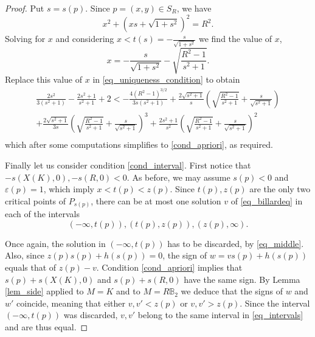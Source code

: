 \documentclass{amsart}
\def \B{\mathbb B}
\def \e{\varepsilon}
\begin{document}
\begin{proof}
	Put $s = s(p)$. Since $p = (x,y) \in S_R$, we have
	\[
		x^2 + (x s + \sqrt{1+s^2})^2 = R^2.
	\]
	Solving for $x$ and considering $x < t(s) = - \frac s {\sqrt{1+s^2}}$ we find the value of $x$,
	\[
		x = - \frac s {\sqrt{1+s^2}} - \sqrt{\frac{R^2-1}{s^2+1}}.
	\]
	Replace this value of $x$ in \eqref{eq_uniqueness_condition} to obtain
	\begin{align}
		\frac{2 s^2}{3 (s^2+1)}-\frac{2 s^2+1}{s^2+1}+2 <
		-\frac{4 (R^2-1)^{3/2}}{3 s (s^2+1)}
		+\frac{2 \sqrt{s^2+1} }{s} \left(\sqrt{\frac{R^2-1}{s^2+1}} +\frac{s}{\sqrt{s^2+1}}\right) \\
		+\frac{2 \sqrt{s^2+1}}{3 s} \left(\sqrt{\frac{R^2-1}{s^2+1}}+\frac{s}{\sqrt{s^2+1}}\right)^3
		+\frac{2 s^2+1}{s^2} \left(\sqrt{\frac{R^2-1}{s^2+1}}+\frac{s}{\sqrt{s^2+1}}\right)^2 \\
	\end{align}
	which after some computations simplifies to \eqref{cond_apriori}, as required.
	
	Finally let us consider condition \eqref{cond_interval}.
	First notice that $-s(X(K),0), -s(R,0) < 0$.
	As before, we may assume $s(p) < 0$ and $\e(p) = 1$, which imply $x < t(p) < z(p)$.
	Since $t(p), z(p)$ are the only two critical points of $P_{s(p)} $, there can be at most one solution $v$ of \eqref{eq_billardeq} in each of the intervals
	\begin{equation}
		\label{eq_intervals}
		(-\infty, t(p)), (t(p), z(p)), (z(p), \infty).
	\end{equation}

	Once again, the solution in $(-\infty, t(p))$ has to be discarded, by \eqref{eq_middle}.
	Also, since $z(p) s(p) + h(s(p)) = 0$, the sign of $w = v s(p) + h(s(p))$ equals that of $z(p) - v$.
	Condition \eqref{cond_apriori} implies that $s(p) + s(X(K),0)$ and $s(p) + s(R,0)$ have the same sign.
	By Lemma \ref{lem_side} applied to $M=K$ and to $M=R \B_2$ we deduce that the signs of $w$ and $w'$ coincide, meaning that either $v,v' < z(p)$ or $v,v' > z(p)$.
	Since the interval $(-\infty, t(p))$ was discarded, $v, v'$ belong to the same interval in \eqref{eq_intervals} and are thus equal.
\end{proof}
\end{document}
